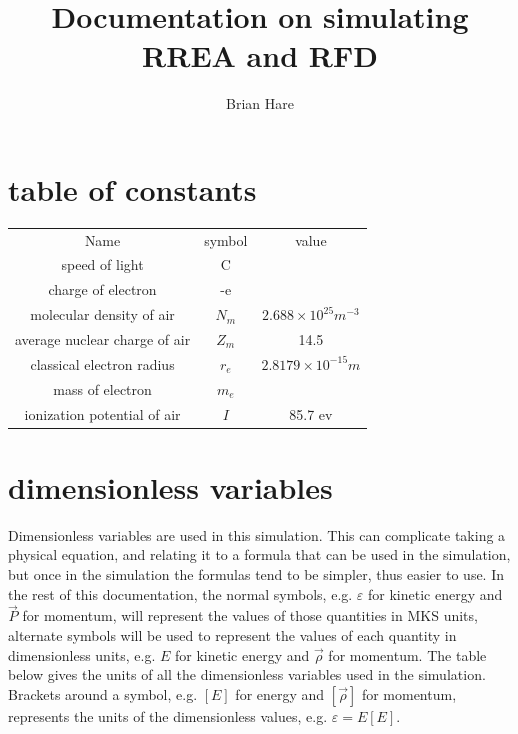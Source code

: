 \documentclass[]{article}
\title{Documentation on simulating RREA and RFD}
\author{Brian Hare}
\begin{document}
\maketitle



\section{table of constants}

\begin{center}
	\begin{tabular}{ c c c }
		Name                          & symbol    &   value  \\ 
		speed of light                & C         &         \\  
		charge of electron            & -e        &         \\  
		molecular density of air      & $N_m$     &   $2.688\times 10^{25} m^{-3} $     \\  
		average nuclear charge of air & $Z_m$     &  14.5       \\  
		classical electron radius     & $r_e$     &   $2.8179\times 10^{-15} m $      \\  
        mass of electron              & $m_e$     &     \\
        ionization potential of air   & $I$       &  85.7 ev    \\  
	\end{tabular}
\end{center}


\section{dimensionless variables}

Dimensionless variables are used in this simulation. This can complicate taking a physical equation, and relating it to a formula that can be used in the simulation, but once in the simulation the formulas tend to be simpler, thus easier to use. In the rest of this documentation, the normal symbols, e.g. $\varepsilon$ for kinetic energy and $ \vec{P} $ for momentum, will represent the values of those quantities in MKS units, alternate symbols will be used to represent the values of each quantity in dimensionless units, e.g. $E$ for kinetic energy and $\vec{\rho} $ for momentum. The table below gives the units of all the dimensionless variables used in the simulation. Brackets around a symbol, e.g.  $\left[ E\right] $ for energy and $\left[  \vec{\rho} \right] $ for momentum, represents the units of the dimensionless values, e.g. $\varepsilon = E \left[ E \right] $.
\end{document}
